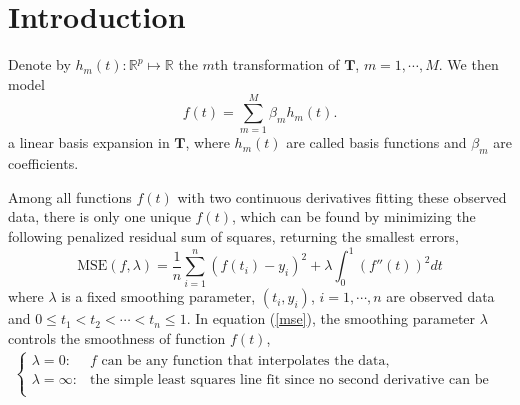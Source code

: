\section{Introduction}


Denote by $h_m(t):\mathbb{R}^p \mapsto \mathbb{R}$ the $m$th transformation of $\mathbf{T}$, $m =1, \cdots ,M$.  We then model
\begin{equation*}
f(t) =\sum_{m=1}^{M}\beta_mh_m(t).
\end{equation*}
 a linear basis expansion in $\mathbf{T}$, where $h_m(t)$ are called basis functions and $\beta_m$ are coefficients.

Among all functions $f(t)$ with two continuous derivatives fitting these observed data, there is only one unique $f(t)$,  which can be found by minimizing the following penalized residual sum of squares, returning the smallest errors,
\begin{equation}\label{mse}
\text{MSE}(f,\lambda)=\frac{1}{n}\sum_{i=1}^n(f(t_i)-y_i)^2+\lambda \int_{0}^{1}(f''(t))^2dt
\end{equation}
where $\lambda$ is a fixed smoothing parameter, $(t_i,y_i)$, $i=1, \cdots, n$ are observed data and $0 \leq t_1< t_2 < \cdots <t_n \leq 1$. In equation (\ref{mse}),  the smoothing parameter $\lambda$ controls the smoothness of function $f(t)$,
\begin{align*}
\begin{cases}
\lambda = 0 : & \mbox{$f$ can be any function that interpolates the data,}\\
\lambda = \infty: & \mbox{the simple least squares line fit since no second derivative can be tolerated.}\\
\end{cases}
\end{align*}

